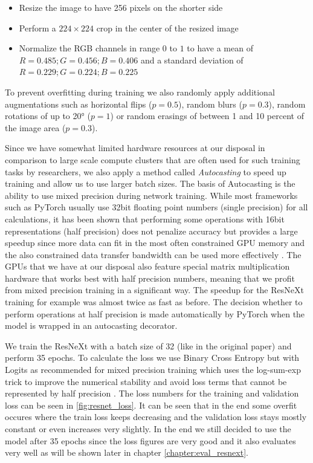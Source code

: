 \begin{itemize}
	\item Resize the image to have 256 pixels on the shorter side
	\item Perform a $224 \times 224$ crop in the center of the resized image
	\item Normalize the RGB channels in range $0$ to $1$ to have a mean of $R=0.485; G=0.456; B=0.406$ and a standard deviation of $R=0.229; G=0.224; B=0.225$
\end{itemize}

To prevent overfitting during training we also randomly apply additional augmentations such as horizontal flips ($p=0.5$), random blurs ($p=0.3$), random rotations of up to 20° ($p=1$) or random erasings of between 1 and 10 percent of the image area ($p=0.3$).

Since we have somewhat limited hardware resources at our disposal in comparison to large scale compute clusters that are often used for such training tasks by researchers, we also apply a method called \textit{Autocasting} to speed up training and allow us to use larger batch sizes. The basis of Autocasting is the ability to use mixed precision during network training. While most frameworks such as PyTorch usually use 32bit floating point numbers (single precision) for all calculations, it has been shown that performing some operations with 16bit representations (half precision) does not penalize accuracy but provides a large speedup since more data can fit in the most often constrained GPU memory and the also constrained data transfer bandwidth can be used more effectively \autocite{micikevicius_mixed_2018}. The GPUs that we have at our disposal also feature special matrix multiplication hardware that works best with half precision numbers, meaning that we profit from mixed precision training in a significant way. The speedup for the ResNeXt training for example was almost twice as fast as before. The decision whether to perform operations at half precision is made automatically by PyTorch when the model is wrapped in an autocasting decorator.

We train the ResNeXt with a batch size of 32 (like in the original paper) and perform 35 epochs. To calculate the loss we use Binary Cross Entropy but with Logits as recommended for mixed precision training which uses the log-sum-exp trick to improve the numerical stability and avoid loss terms that cannot be represented by half precision \autocite{pytorch_team_automatic_nodate}. The loss numbers for the training and validation loss can be seen in \vref{fig:resnet_loss}. It can be seen that in the end some overfit occures where the train loss keeps decreasing and the validation loss stays mostly constant or even increases very slightly. In the end we still decided to use the model after 35 epochs since the loss figures are very good and it also evaluates very well as will be shown later in chapter \vref{chapter:eval_resnext}.

